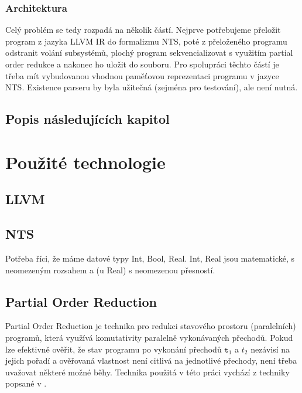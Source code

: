 \documentclass[10pt,a4paper,notitlepage]{report}
\begin{document}
\subsection{Architektura}
Celý problém se tedy rozpadá na několik částí. Nejprve potřebujeme přeložit program z jazyka LLVM IR do formalizmu NTS, poté z přeloženého programu odstranit volání subsystémů, plochý program sekvencializovat s využitím partial order redukce a nakonec ho uložit do souboru. Pro spolupráci těchto částí je třeba mít vybudovanou vhodnou paměťovou reprezentaci programu v jazyce NTS. Existence parseru by byla užitečná (zejména pro testování), ale není nutná.

\section{Popis následujících kapitol}



\chapter{Použité technologie}
\section{LLVM}
\section{NTS}
Potřeba říci, že máme datové typy Int, Bool, Real. Int, Real jsou matematické, s neomezeným rozsahem a (u Real) s neomezenou přesností.

\section{Partial Order Reduction}
Partial Order Reduction je technika pro redukci stavového prostoru (paralelních) programů, která využívá komutativity paralelně vykonávaných přechodů. Pokud lze efektivně ověřit, že stav programu po vykonání přechodů $\texttt{t}_1$ a $t_2$ nezávisí na jejich pořadí a ověřovaná vlastnost není citlivá na jednotlivé přechody, není třeba uvažovat některé možné běhy. Technika použitá v této práci vychází z techniky popsané v \cite{CLARKE}.
\end{document}
